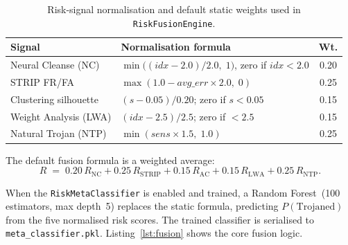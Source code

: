 \documentclass[12pt, letterpaper]{article}
\begin{document}
\begin{table}[!htbp]
  \centering
  \caption{Risk-signal normalisation and default static weights used in
    \texttt{RiskFusionEngine}.}
  \label{tab:fusion-weights}
  \small
  \begin{tabularx}{\linewidth}{@{} l X c @{}}
    \toprule
    \textbf{Signal}            & \textbf{Normalisation formula}               & \textbf{Wt.} \\
    \midrule
    Neural Cleanse (NC)        & $\min\bigl((\mathit{idx}-2.0)/2.0,\;1\bigr)$, zero if $\mathit{idx}<2.0$ & 0.20 \\
    STRIP FR/FA                & $\max(1.0 - \mathit{avg\_err}\times2.0,\;0)$  & 0.25 \\
    Clustering silhouette      & $(s-0.05)/0.20$; zero if $s<0.05$            & 0.15 \\
    Weight Analysis (LWA)      & $(\mathit{idx}-2.5)/2.5$; zero if $<2.5$     & 0.15 \\
    Natural Trojan (NTP)       & $\min(\mathit{sens}\times1.5,\;1.0)$         & 0.25 \\
    \bottomrule
  \end{tabularx}
\end{table}


The default fusion formula is a weighted average:
\begin{equation}
  R \;=\; 0.20\,R_{\mathrm{NC}} + 0.25\,R_{\mathrm{STRIP}}
        + 0.15\,R_{\mathrm{AC}} + 0.15\,R_{\mathrm{LWA}}
        + 0.25\,R_{\mathrm{NTP}}.
\end{equation}

When the \texttt{RiskMetaClassifier} is enabled and trained, a Random
Forest~(100 estimators, max depth~5) replaces the static formula, predicting
$P(\text{Trojaned})$ from the five normalised risk scores.  The trained
classifier is serialised to \texttt{meta\_classifier.pkl}.
Listing~\ref{lst:fusion} shows the core fusion logic.
\end{document}

